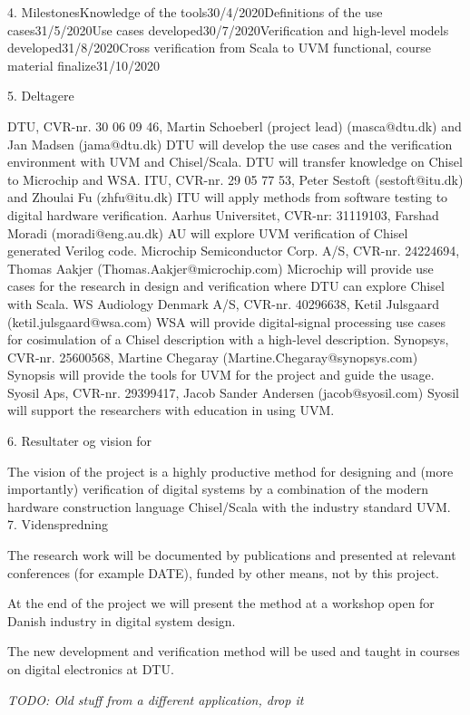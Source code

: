 \documentclass[fleqn,12pt]{article}
\newcommand{\todo}[1]{{\it TODO: #1}}
\begin{document}
4. MilestonesKnowledge of the tools30/4/2020Definitions of the use cases31/5/2020Use cases developed30/7/2020Verification and high-level models developed31/8/2020Cross verification from Scala to UVM functional, course material finalize31/10/2020

5. Deltagere



DTU, CVR-nr. 30 06 09 46, Martin Schoeberl (project lead) (masca@dtu.dk) and Jan Madsen (jama@dtu.dk)
DTU will develop the use cases and the verification environment with UVM and Chisel/Scala. DTU will transfer knowledge on Chisel to Microchip and WSA.
ITU, CVR-nr. 29 05 77 53, Peter Sestoft (sestoft@itu.dk) and Zhoulai Fu (zhfu@itu.dk)
ITU will apply methods from software testing to digital hardware verification.
Aarhus Universitet, CVR-nr: 31119103, Farshad Moradi (moradi@eng.au.dk)
AU will explore UVM verification of Chisel generated Verilog code.
Microchip Semiconductor Corp. A/S, CVR-nr. 24224694, Thomas Aakjer (Thomas.Aakjer@microchip.com)
Microchip will provide use cases for the research in design and verification where DTU can explore Chisel with Scala.
WS Audiology Denmark A/S, CVR-nr. 40296638, Ketil Julsgaard (ketil.julsgaard@wsa.com)
WSA will provide digital-signal processing use cases for cosimulation of a Chisel description with a high-level description.
Synopsys, CVR-nr. 25600568, Martine Chegaray (Martine.Chegaray@synopsys.com)
Synopsis will provide the tools for UVM for the project and guide the usage.
Syosil Aps, CVR-nr. 29399417, Jacob Sander Andersen (jacob@syosil.com)
Syosil will support the researchers with education in using UVM.


6. Resultater og vision for 

The vision of the project is a highly productive method for designing and (more importantly) verification of digital systems by a combination of the modern hardware construction language Chisel/Scala with the industry standard UVM.
7. Videnspredning

The research work will be documented by publications and presented at relevant conferences (for example DATE), funded by other means, not by this project.

At the end of the project we will present the method at a workshop open for Danish industry in digital system design.

The new development and verification method will be used and taught in courses on digital electronics at DTU.\newpage

\todo{Old stuff from a different application, drop it}
\end{document}
